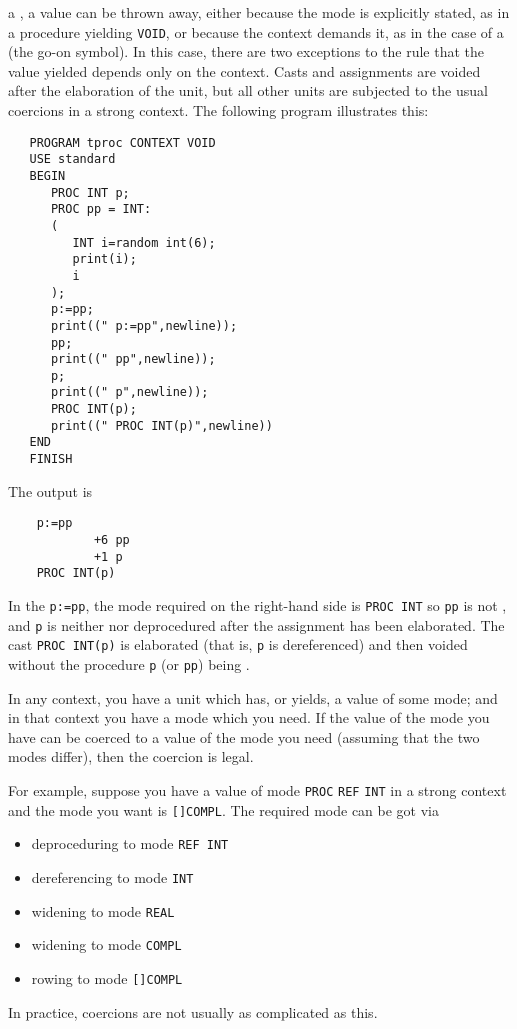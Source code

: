  a , a
value can be thrown away, either because the mode  is
explicitly stated, as in a procedure yielding \verb|VOID|, or because
the context demands it, as in the case of a
 (the go-on symbol).  In this case, there
are two exceptions to the rule that the value yielded depends only on
the context. Casts and assignments are voided after the elaboration
of the unit, but all other units are subjected to the usual coercions
in a strong context.  The following program illustrates this:
\begin{verbatim}
   PROGRAM tproc CONTEXT VOID
   USE standard
   BEGIN
      PROC INT p;
      PROC pp = INT:
      (
         INT i=random int(6);
         print(i);
         i
      );
      p:=pp;
      print((" p:=pp",newline));
      pp;
      print((" pp",newline));
      p;
      print((" p",newline));
      PROC INT(p);
      print((" PROC INT(p)",newline))
   END
   FINISH
\end{verbatim}
\noindent
The output is
\begin{verbatim}
    p:=pp
            +6 pp
            +1 p
    PROC INT(p)
\end{verbatim}
\noindent
In the  \verb|p:=pp|, the mode required on the
right-hand side is \verb|PROC INT| so \verb|pp| is not
, and \verb|p| is neither
 nor deprocedured after the
assignment has been elaborated. The cast \verb|PROC INT(p)| is
elaborated (that is, \verb|p| is dereferenced) and then voided
without the procedure \verb|p| (or \verb|pp|) being
.

In any context, you have a unit which has, or yields, a value of some
mode; and in that context you have a mode which you need. If the
value of the mode you have can be coerced to a value of the mode you
need (assuming that the two modes differ), then the coercion is legal.

For example, suppose you have a value of mode \verb|PROC| \verb|REF|
\verb|INT| in a strong context and the mode you want is
\verb|[]COMPL|.  The required mode can be got via
\begin{itemize}
\item deproceduring to mode \verb|REF INT|
\item dereferencing to mode \verb|INT|
\item widening to mode \verb|REAL|
\item widening to mode \verb|COMPL|
\item rowing to mode \verb|[]COMPL|
\end{itemize}
In practice, coercions are not usually as complicated as this.


